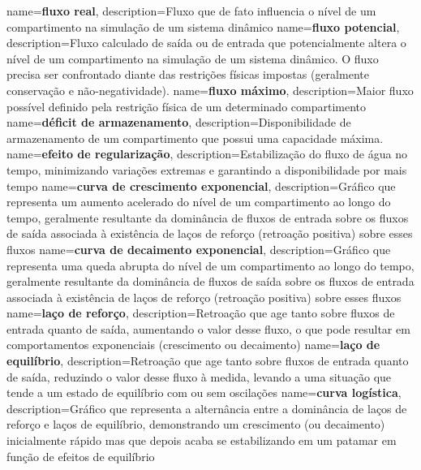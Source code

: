 {
    name=\textbf{fluxo real},
    description={Fluxo que de fato influencia o nível de um compartimento na simulação de um sistema dinâmico}
}
{
    name=\textbf{fluxo potencial},
    description={Fluxo calculado de saída ou de entrada que potencialmente altera o nível de um compartimento na simulação de um sistema dinâmico. O fluxo precisa ser confrontado diante das restrições físicas impostas (geralmente conservação e não-negatividade).}
}
{
    name=\textbf{fluxo máximo},
    description={Maior fluxo possível definido pela restrição física de um determinado compartimento}
}
{
    name=\textbf{déficit de armazenamento},
    description={Disponibilidade de armazenamento de um compartimento que possui uma capacidade máxima.}
}
{
    name=\textbf{efeito de regularização},
    description={Estabilização do fluxo de água no tempo, minimizando variações extremas e garantindo a disponibilidade por mais tempo}
}
{
    name=\textbf{curva de crescimento exponencial},
    description={Gráfico que representa um aumento acelerado do nível de um compartimento ao longo do tempo, geralmente resultante da dominância de fluxos de entrada sobre os fluxos de saída associada à existência de laços de reforço (retroação positiva) sobre esses fluxos}
}
{
    name=\textbf{curva de decaimento exponencial},
    description={Gráfico que representa uma queda abrupta do nível de um compartimento ao longo do tempo, geralmente resultante da dominância de fluxos de saída sobre os fluxos de entrada associada à existência de laços de reforço (retroação positiva) sobre esses fluxos}
}
{
    name=\textbf{laço de reforço},
    description={Retroação que age tanto sobre fluxos de entrada quanto de saída, aumentando o valor desse fluxo, o que pode resultar em comportamentos exponenciais (crescimento ou decaimento)}
}
{
    name=\textbf{laço de equilíbrio},
    description={Retroação que age tanto sobre fluxos de entrada quanto de saída, reduzindo o valor desse fluxo à medida, levando a uma situação que tende a um estado de equilíbrio com ou sem oscilações}
}
{
    name=\textbf{curva logística},
    description={Gráfico que representa a alternância entre a dominância de laços de reforço e laços de equilíbrio, demonstrando um crescimento (ou decaimento) inicialmente rápido mas que depois acaba se estabilizando em um patamar em função de efeitos de equilíbrio}
}
